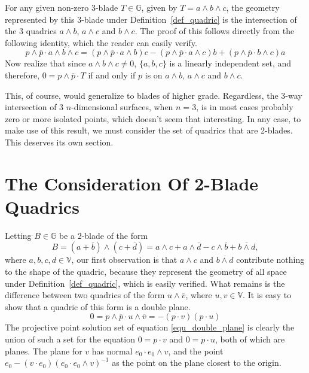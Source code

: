 \documentclass[12pt]{article}
\newcommand{\G}{\mathbb{G}}
\newcommand{\V}{\mathbb{V}}
\numberwithin{equation}{section}
\begin{document}
For any given non-zero 3-blade $T\in\G$, given by $T=a\wedge b\wedge c$, the
geometry represented by this 3-blade under Definition~\ref{def_quadric} is the intersection
of the 3 quadrics $a\wedge b$, $a\wedge c$ and $b\wedge c$.
The proof of this follows directly from the following identity, which the reader can easily verify.
\begin{equation}
p\wedge\overline{p}\cdot a\wedge b\wedge c
 = (p\wedge\overline{p}\cdot a\wedge b)c
 - (p\wedge\overline{p}\cdot a\wedge c)b
 + (p\wedge\overline{p}\cdot b\wedge c)a
\end{equation}
Now realize that since $a\wedge b\wedge c\neq 0$, $\{a,b,c\}$ is a linearly
independent set, and therefore, $0=p\wedge\overline{p}\cdot T$ if and
only if $p$ is on $a\wedge b$, $a\wedge c$ and $b\wedge c$.

This, of course, would generalize to blades of higher grade.  Regardless, the
3-way intersection of 3 $n$-dimensional surfaces, when $n=3$, is in most cases probably
zero or more isolated points, which doesn't seem that interesting.  In any case,
to make use of this result, we must consider
the set of quadrics that are 2-blades.  This deserves its own section.

\section{The Consideration Of 2-Blade Quadrics}

Letting $B\in\G$ be a 2-blade of the form
\begin{equation}\label{equ_two_blade_quadric}
B = (a+\overline{b})\wedge(c+\overline{d}) = a\wedge c + a\wedge\overline{d} - c\wedge\overline{b} + \overline{b\wedge d},
\end{equation}
where $a,b,c,d\in\V$, our first observation is that $a\wedge c$ and $\overline{b\wedge d}$ contribute nothing
to the shape of the quadric, because they represent the geometry of all space under
Definition~\ref{def_quadric}, which is easily verified.  What remains is the difference
between two quadrics of the form $u\wedge\overline{v}$, where $u,v\in\V$.  It is
easy to show that a quadric of this form is a double plane.
\begin{equation}\label{equ_double_plane}
0 = p\wedge\overline{p}\cdot u\wedge\overline{v} = -(p\cdot v)(p\cdot u)
\end{equation}
The projective point solution set of equation \eqref{equ_double_plane} is
clearly the union of such a set for the equation $0=p\cdot v$ and $0=p\cdot u$,
both of which are planes.  The plane for $v$ has normal $e_0\cdot e_0\wedge v$,
and the point $e_0-(v\cdot e_0)(e_0\cdot e_0\wedge v)^{-1}$ as the point on the plane closest to the origin.
\end{document}
